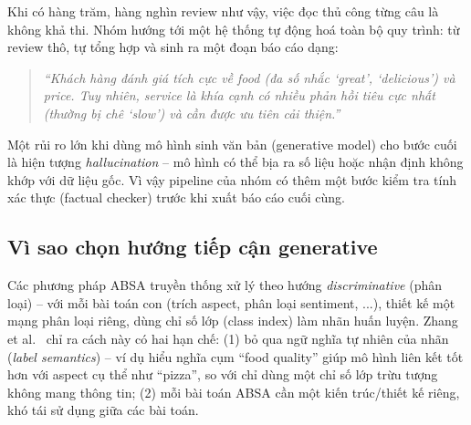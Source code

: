 \documentclass[11pt,a4paper]{article}
\begin{document}
Khi có hàng trăm, hàng nghìn review như vậy, việc đọc thủ công từng câu là
không khả thi. Nhóm hướng tới một hệ thống tự động hoá toàn bộ quy trình: từ
review thô, tự tổng hợp và sinh ra một đoạn báo cáo dạng:

\begin{quote}
\emph{``Khách hàng đánh giá tích cực về food (đa số nhắc `great', `delicious')
và price. Tuy nhiên, service là khía cạnh có nhiều phản hồi tiêu cực nhất
(thường bị chê `slow') và cần được ưu tiên cải thiện.''}
\end{quote}

Một rủi ro lớn khi dùng mô hình sinh văn bản (generative model) cho bước cuối
là hiện tượng \emph{hallucination} -- mô hình có thể bịa ra số liệu hoặc nhận
định không khớp với dữ liệu gốc. Vì vậy pipeline của nhóm có thêm một bước
kiểm tra tính xác thực (factual checker) trước khi xuất báo cáo cuối cùng.

\subsection{Vì sao chọn hướng tiếp cận generative}
\label{sec:whygenerative}

Các phương pháp ABSA truyền thống xử lý theo hướng \emph{discriminative}
(phân loại) -- với mỗi bài toán con (trích aspect, phân loại sentiment,
...), thiết kế một mạng phân loại riêng, dùng chỉ số lớp (class index) làm
nhãn huấn luyện. Zhang et al.~\cite{genabsa} chỉ ra cách này có hai hạn
chế: (1) bỏ qua ngữ nghĩa tự nhiên của nhãn (\emph{label semantics}) --
ví dụ hiểu nghĩa cụm ``food quality'' giúp mô hình liên kết tốt hơn với
aspect cụ thể như ``pizza'', so với chỉ dùng một chỉ số lớp trừu tượng
không mang thông tin; (2) mỗi bài toán ABSA cần một kiến trúc/thiết kế
riêng, khó tái sử dụng giữa các bài toán.
\end{document}
